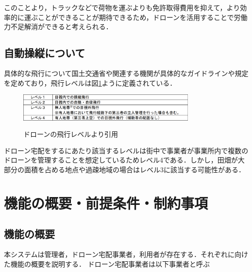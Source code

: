 \documentclass[a4paper, titlepage]{jsarticle}
\begin{document}
このことより，トラックなどで荷物を運ぶよりも免許取得費用を抑えて，より効率的に運ぶことができることが期待できるため，ドローンを活用することで労働力不足解消ができると考えられる．


\subsection{自動操縦について}
具体的な飛行について国土交通省や関連する機関が具体的なガイドラインや規定を定めており，飛行レベルは図\ref{fig:dron_level}ように定義されている．
\begin{figure}[htbp]
  \centering
  \includegraphics[width=0.8\textwidth]{flying_level.pdf}
  \label{fig:dron_level}
  \caption{ドローンの飛行レベル\cite{delivery_guidelines_2023}より引用}
\end{figure}

ドローン宅配をするにあたり該当するレベルは街中で事業者が事業所内で複数のドローンを管理することを想定しているためレベル4である．しかし，田畑が大部分の面積を占める地点や過疎地域の場合はレベル3に該当する可能性がある．



\section{機能の概要・前提条件・制約事項}
\subsection{機能の概要}
本システムは管理者，ドローン宅配事業者，利用者が存在する．それぞれに向けた機能の概要を説明する．
ドローン宅配事業者は以下事業者と呼ぶ
\end{document}
